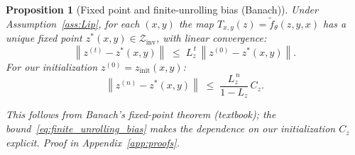 \documentclass{article}
\theoremstyle{plain}
\newtheorem{proposition}[theorem]{Proposition}
\theoremstyle{definition}
\theoremstyle{remark}
\newtheorem{remark}[theorem]{Remark}
\newcommand{\longonly}[1]{}
\newcommand{\longonly}[1]{#1}
\newcommand{\norm}[1]{\left\lVert #1 \right\rVert}
\begin{document}
{\begin{proposition}[Fixed point and finite-unrolling bias (Banach)]
\label{prop:banach}
Under Assumption~\ref{ass:Lip}, for each $(x,y)$ the map $T_{x,y}(z)=\tilde f_\theta(z,y,x)$ has a unique fixed point $z^*(x,y) \in \mathcal{Z}_{\mathrm{inv}}$, with linear convergence:
\begin{equation}
\norm{z^{(t)} - z^*(x,y)}
\;\le\;
L_z^{\,t}\,\norm{z^{(0)} - z^*(x,y)}.
\label{eq:linear_convergence}
\end{equation}
For our initialization $z^{(0)} = z_{\mathrm{init}}(x,y)$:
\begin{equation}
\norm{z^{(n)}-z^*(x,y)}
\;\le\;
\frac{L_z^{\,n}}{1-L_z}\,C_z.
\label{eq:finite_unrolling_bias}
\end{equation}
\end{proposition}
\emph{This follows from Banach's fixed-point theorem (textbook); the bound~\eqref{eq:finite_unrolling_bias} makes the dependence on our initialization $C_z$ explicit. Proof in Appendix~\ref{app:proofs}.}

\longonly{
\begin{remark}[Trade-off: contraction strength vs.\ convergence speed]
\label{rem:tradeoff}
If $L_z$ is close to 1, the bound $\frac{L_z^n}{1-L_z}C_z$ becomes large, requiring more unrolling steps $n$ to achieve small bias.
Stronger contraction (smaller $L_z$) yields faster convergence but may limit the expressivity of the latent dynamics.
\end{remark}}

}
\end{document}
